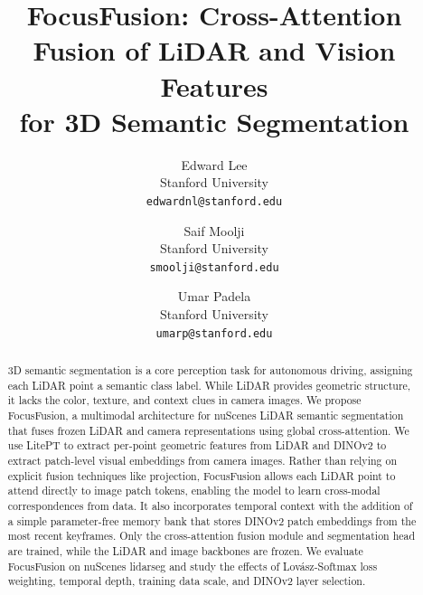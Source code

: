 \documentclass[10pt,twocolumn,letterpaper]{article}
\begin{document}
\title{FocusFusion: Cross-Attention Fusion of LiDAR and Vision Features\\for 3D Semantic Segmentation}

\author{Edward Lee\\
Stanford University\\
{\tt\small edwardnl@stanford.edu}
\and
Saif Moolji\\
Stanford University\\
{\tt\small smoolji@stanford.edu}
\and
Umar Padela\\
Stanford University\\
{\tt\small umarp@stanford.edu}
}

\maketitle

\begin{abstract}
\par \noindent 3D semantic segmentation is a core perception task for autonomous driving, assigning each LiDAR point a semantic class label. While LiDAR provides geometric structure, it lacks the color, texture, and context clues in camera images. We propose FocusFusion, a multimodal architecture for nuScenes LiDAR semantic segmentation that fuses frozen LiDAR and camera representations using global cross-attention. We use LitePT to extract per-point geometric features from LiDAR and DINOv2 to extract patch-level visual embeddings from camera images. Rather than relying on explicit fusion techniques like projection, FocusFusion allows each LiDAR point to attend directly to image patch tokens, enabling the model to learn cross-modal correspondences from data. It also incorporates temporal context with the addition of a simple parameter-free memory bank that stores DINOv2 patch embeddings from the most recent keyframes. Only the cross-attention fusion module and segmentation head are trained, while the LiDAR and image backbones are frozen. We evaluate FocusFusion on nuScenes lidarseg and study the effects of Lovász-Softmax loss weighting, temporal depth, training data scale, and DINOv2 layer selection.
\end{abstract}
\end{document}
